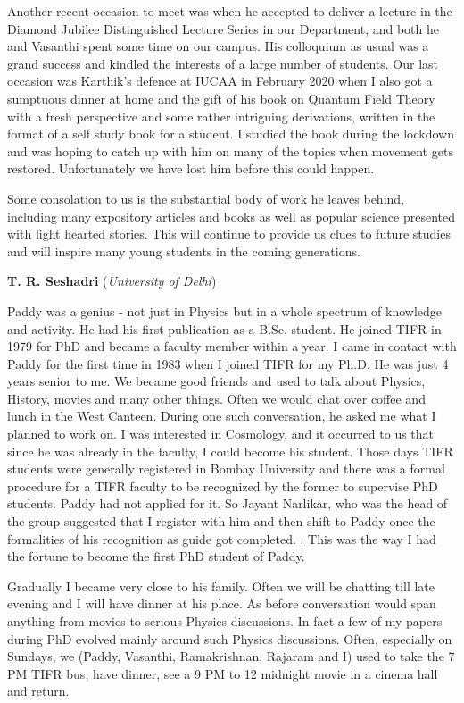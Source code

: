 \documentclass[prd, preprint, longbibliography, 12pt]{revtex4-2}
\begin{document}
Another recent occasion to meet was when he accepted to deliver a lecture in the Diamond Jubilee Distinguished Lecture Series in our Department, and both he and Vasanthi spent some time on our campus.  His colloquium as usual was a grand success and kindled the interests of a large number of students. Our last occasion was Karthik’s defence at IUCAA in February 2020 when I also got a sumptuous dinner at home and the gift of his book on Quantum Field Theory with a fresh perspective and some rather intriguing derivations, written in the format of a self study book for a student. I studied the book during the lockdown and was hoping to catch up with him on many of the topics when movement gets restored. Unfortunately we have lost him before this could happen. 


Some consolation to us is the substantial body of work he leaves behind, including many expository articles and books as well as popular science  presented with light hearted stories. This will continue to provide us clues to future studies and will inspire many young students in the coming generations. 

\bigskip
\bigskip

\centerline{{\bf T. R. Seshadri} ({\it University of Delhi})}
\medskip
{}

\noindent Paddy was a genius - not just in Physics but in a whole spectrum of knowledge and activity. He had his first publication as a B.Sc. student. He joined TIFR in 1979 for PhD and became a faculty member within a year. I came in contact with Paddy for the first time in 1983 when I joined TIFR for my Ph.D. He was just 4 years senior to me. We became good friends and used to talk about Physics, History, movies and many other things. Often we would chat over coffee and lunch in the West Canteen. During one such conversation, he asked me what I planned to work on. I was interested in Cosmology, and it occurred to us that since he was already in the faculty, I could become his student. Those days TIFR students were generally registered in Bombay University and there was a formal procedure for a TIFR faculty to be recognized by the former to supervise PhD students. Paddy had not applied for it. So Jayant Narlikar, who was the head of the group suggested that I register with him and then shift to Paddy once the formalities of his recognition as guide got completed. . This was the way I had the fortune to become the first PhD student of Paddy.

Gradually I became very close to his family. Often we will be chatting till late evening and I will have dinner at his place. As before conversation would span anything from movies to serious Physics discussions. In fact a few of my papers during PhD evolved mainly around such Physics discussions. Often, especially on Sundays, we (Paddy, Vasanthi, Ramakrishnan, Rajaram and I) used to take the 7 PM TIFR bus, have dinner, see a 9 PM to 12 midnight movie in a cinema hall and return.
\end{document}
